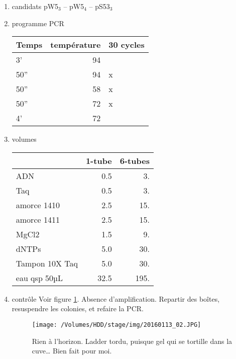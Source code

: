 \documentclass[9pt, oneside, twocolumn]{scrartcl}
\begin{document}
\begin{enumerate}
\item candidats
\label{sec:orgheadline24}
pW5\(_{\text{3}}\) -- pW5\(_{\text{4}}\) -- pS53\(_{\text{3}}\) 

\item programme PCR
\label{sec:orgheadline25}
\begin{center}
\begin{tabular}{lrl}
\toprule
Temps & température & 30 cycles\\
\midrule
3' & 94 & \\
50'' & 94 & x\\
50'' & 58 & x\\
50'' & 72 & x\\
4' & 72 & \\
\bottomrule
\end{tabular}
\end{center}

\item volumes
\label{sec:orgheadline26}
\begin{center}
\begin{tabular}{lrr}
\toprule
 & 1-tube & 6-tubes\\
\midrule
ADN & 0.5 & 3.\\
Taq & 0.5 & 3.\\
amorce 1410 & 2.5 & 15.\\
amorce 1411 & 2.5 & 15.\\
MgCl2 & 1.5 & 9.\\
dNTPs & 5.0 & 30.\\
Tampon 10X Taq & 5.0 & 30.\\
\midrule
eau qsp 50µL & 32.5 & 195.\\
\bottomrule
\end{tabular}
\end{center}

\item contrôle
\label{sec:orgheadline27}
Voir figure \ref{fig:orgparagraph3}. 
Absence d'amplification. Repartir des boîtes, resuspendre les colonies, et
refaire la PCR. 

\begin{figure}[htb]
\centering
\texttt{[image: /Volumes/HDD/stage/img/20160113\_02.JPG]}
\caption{\label{fig:orgparagraph3}
Rien à l'horizon. Ladder tordu, puisque gel qui se tortille dans la cuve… Bien fait pour moi.}
\end{figure}
\end{enumerate}
\end{document}
